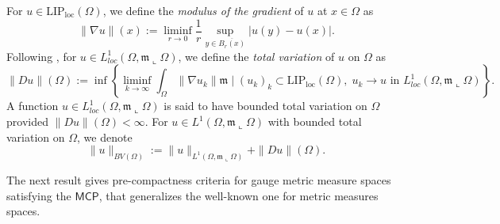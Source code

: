 \documentclass[11pt,a4paper]{article}
\theoremstyle{plain}
\theoremstyle{definition}
\theoremstyle{remark}
\numberwithin{equation}{section}
\newcommand{\MCP}{\mathsf{MCP}}
\newcommand{\loc}{\mathrm{loc}}
\newcommand{\mm}{\mathfrak m}
\begin{document}
For $u\in \mathrm{LIP}_{\loc}(\Omega)$, we define the \emph{modulus of the gradient} of $u$ at $x\in \Omega$ as
\begin{equation}
\| \nabla u \| (x) := \liminf_{r \to 0} \frac{1}{r} \sup_{y\in \overline{B_r (x)}} |u(y)-u(x)|.
\end{equation}
Following \cite[Sec. 3]{Miranda}, for $u\in L^1_{loc}(\Omega, \mm\llcorner \Omega)$, we define the \emph{total variation} of $u$ on $\Omega$ as
\begin{equation}
\|Du\|(\Omega):=\inf \left \{ \liminf_{k\to \infty} \int_\Omega \| \nabla u_k\| \mm \mid (u_k)_k\subset \mathrm{LIP}_{\loc}(\Omega), \; u_k \to u \text{ in } L^1_{loc}(\Omega,\mm\llcorner \Omega) \right\} .
\end{equation}
A function $u\in L^1_{loc}(\Omega, \mm\llcorner \Omega)$ is said to have bounded total variation on $\Omega$ provided $\|Du\|(\Omega)<\infty$. For $u\in L^1(\Omega, \mm\llcorner \Omega)$ with bounded total variation on $\Omega$, we denote
\begin{equation}
\|u\|_{BV(\Omega)}:=\|u\|_{L^1(\Omega,  \mm\llcorner \Omega)}+\|Du \|(\Omega).
\end{equation}

The next result gives pre-compactness criteria for gauge metric measure spaces satisfying the $\MCP$, that generalizes the well-known one for metric measures spaces. 
\end{document}
